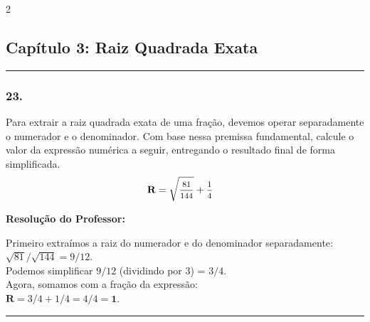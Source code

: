 \begin{multicols*}{2}
\par\vspace{\espacoQuestao}

\subsection*{Capítulo 3: Raiz Quadrada Exata}
\vspace{-0.2cm}\noindent\rule{\linewidth}{1.5pt} 
\par\vspace{\espacoPosTitulo}
\subsubsection*{23.} Para extrair a raiz quadrada exata de uma fração, devemos operar separadamente o numerador e o denominador. Com base nessa premissa fundamental, calcule o valor da expressão numérica a seguir, entregando o resultado final de forma simplificada.
$$
\begin{aligned}
& \textbf{R} = \sqrt{\mfrac{81}{144}} + \mfrac{1}{4}
\end{aligned}
$$

\ifgabarito
    \begin{tcolorbox}[colback=CorTitUm!5, colframe=CorTitUm, boxrule=1pt, arc=4pt, left=6pt, right=6pt, top=6pt, bottom=6pt]
    \small\textbf{\textcolor{CorTitUm}{Resolução do Professor:}}\par\vspace{0.1cm}
    \color{CinzaEscuro}
    Primeiro extraímos a raiz do numerador e do denominador separadamente:\\
    $ \sqrt{81} / \sqrt{144} = 9/12 $.\\
    Podemos simplificar $ 9/12 $ (dividindo por 3) = $ 3/4 $.\\
    Agora, somamos com a fração da expressão:\\
    $ \textbf{R} = 3/4 + 1/4 = 4/4 = \textbf{1} $.
    \end{tcolorbox}
\fi

\par\vspace{\espacoQuestao}

\noindent\textcolor{CorLinha}{\rule{\linewidth}{0.5pt}} 
\par\vspace{\espacoPreQuestao}

\end{multicols*}
